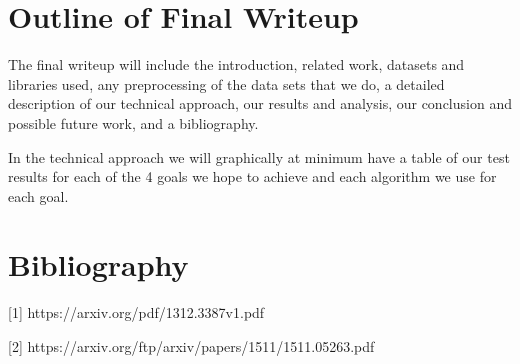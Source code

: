 \documentclass{article}
\begin{document}
\section{Outline of Final Writeup}
The final writeup will include the introduction, related work, datasets and libraries used, any preprocessing of the data sets that we do, a detailed description of our technical approach, our results and analysis, our conclusion and possible future work, and a bibliography.

In the technical approach we will graphically at minimum have a table of our test results for each of the 4 goals we hope to achieve and each algorithm we use for each goal.


\section{Bibliography}
[1] https://arxiv.org/pdf/1312.3387v1.pdf

[2] https://arxiv.org/ftp/arxiv/papers/1511/1511.05263.pdf
\end{document}
